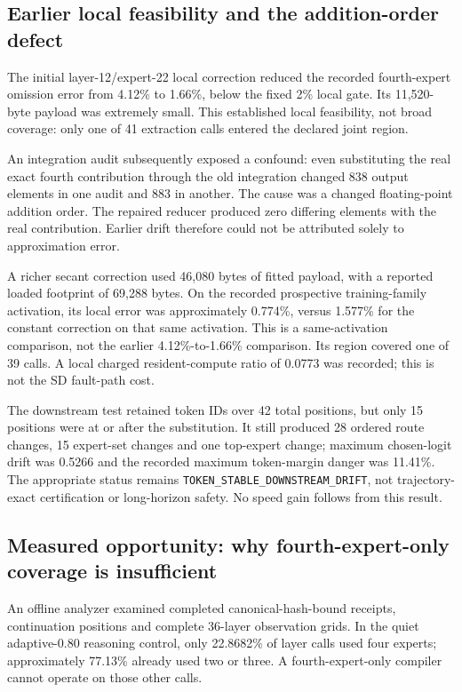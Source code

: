 \subsection{Earlier local feasibility and the addition-order defect}
The initial layer-12/expert-22 local correction reduced the recorded
fourth-expert omission error from 4.12\% to 1.66\%, below the fixed 2\%
local gate. Its 11,520-byte payload was extremely small. This established
local feasibility, not broad coverage: only one of 41 extraction calls
entered the declared joint region.

An integration audit subsequently exposed a confound: even substituting
the real exact fourth contribution through the old integration changed
838 output elements in one audit and 883 in another. The cause was a changed
floating-point addition order. The repaired reducer produced zero differing
elements with the real contribution. Earlier drift therefore could not be
attributed solely to approximation error.

A richer secant correction used 46,080 bytes of fitted payload, with a
reported loaded footprint of 69,288 bytes. On the recorded prospective
training-family activation, its local error was approximately 0.774\%, versus
1.577\% for the constant correction on that same activation. This is a
same-activation comparison, not the earlier 4.12\%-to-1.66\% comparison.
Its region covered one of 39 calls. A local charged resident-compute ratio
of 0.0773 was recorded; this is not the SD fault-path cost.

The downstream test retained token IDs over 42 total positions, but only
15 positions were at or after the substitution. It still produced 28 ordered
route changes, 15 expert-set changes and one top-expert change; maximum
chosen-logit drift was 0.5266 and the recorded maximum token-margin danger
was 11.41\%. The appropriate status remains
\texttt{TOKEN\_STABLE\_DOWNSTREAM\_DRIFT}, not trajectory-exact certification
or long-horizon safety. No speed gain follows from this result.

\subsection{Measured opportunity: why fourth-expert-only coverage is insufficient}
An offline analyzer examined completed canonical-hash-bound receipts,
continuation positions and complete 36-layer observation grids. In the quiet
adaptive-0.80 reasoning control, only 22.8682\% of layer calls used four
experts; approximately 77.13\% already used two or three. A fourth-expert-only
compiler cannot operate on those other calls.

